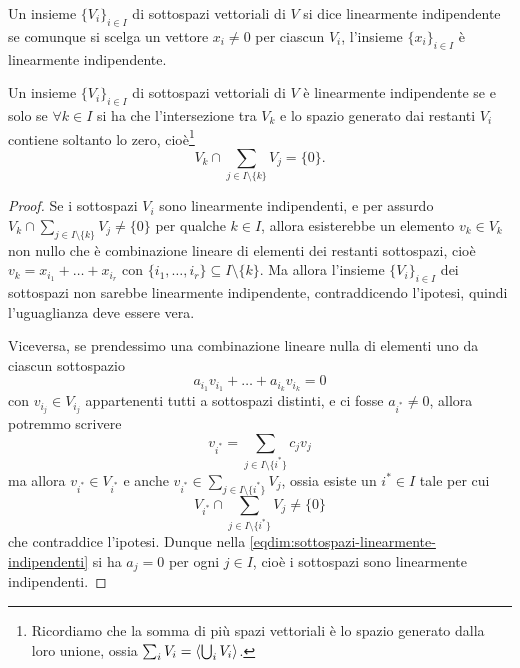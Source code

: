 \begin{definizione} \label{d:insieme-linearmente-indipendente}
	Un insieme $\{V_i\}_{i\in I}$ di sottospazi vettoriali di $V$ si dice linearmente indipendente se comunque si scelga un vettore $x_i\neq 0$ per ciascun $V_i$, l'insieme $\{x_i\}_{i\in I}$ è linearmente indipendente.
\end{definizione}
\begin{teorema} \label{t:sottospazi-linearmente-indipendenti-intersezione}
	Un insieme $\{V_i\}_{i\in I}$ di sottospazi vettoriali di $V$ è linearmente indipendente se e solo se $\forall k\in I$ si ha che l'intersezione tra $V_k$ e lo spazio generato dai restanti $V_i$ contiene soltanto lo zero, cioè\footnote{Ricordiamo che la somma di più spazi vettoriali è lo spazio generato dalla loro unione, ossia $\sum_i V_i=\left\langle{\bigcup_i V_i}\right\rangle$.}
	\begin{equation*}
		V_k\cap\sum_{j\in I\setminus\{k\}}{V_j}=\{0\}.
	\end{equation*}
\end{teorema}
\begin{proof}
	Se i sottospazi $V_i$ sono linearmente indipendenti, e per assurdo $V_k\cap\sum_{j\in I\setminus\{k\}}{V_j}\neq\{0\}$ per qualche $k\in I$, allora esisterebbe un elemento $v_k\in V_k$ non nullo che è combinazione lineare di elementi dei restanti sottospazi, cioè $v_k=x_{i_1}+\dots+x_{i_r}$ con $\{i_1,\dots,i_r\}\subseteq I\setminus\{k\}$.
	Ma allora l'insieme $\{V_i\}_{i\in I}$ dei sottospazi non sarebbe linearmente indipendente, contraddicendo l'ipotesi, quindi l'uguaglianza deve essere vera.

	Viceversa, se prendessimo una combinazione lineare nulla di elementi uno da ciascun sottospazio
	\begin{equation}
		a_{i_1}v_{i_1}+\dots+a_{i_k}v_{i_k}=0
		\label{eqdim:sottospazi-linearmente-indipendenti}
	\end{equation}
	con $v_{i_j}\in V_{i_j}$ appartenenti tutti a sottospazi distinti, e ci fosse $a_{i^*}\ne 0$, allora potremmo scrivere
	\begin{equation}
		v_{i^*}=\sum_{j\in I\setminus\{i^*\}}c_jv_j
	\end{equation}
	ma allora $v_{i^*}\in V_{i^*}$ e anche $v_{i^*}\in\sum_{j\in I\setminus\{i^*\}}V_j$, ossia esiste un $i^*\in I$ tale per cui
	\begin{equation*}
		V_{i^*}\cap\sum_{j\in I\setminus\{i^*\}}V_j\ne\{0\}
	\end{equation*}
	che contraddice l'ipotesi.
	Dunque nella \eqref{eqdim:sottospazi-linearmente-indipendenti} si ha $a_j=0$ per ogni $j\in I$, cioè i sottospazi sono linearmente indipendenti.
\end{proof}

